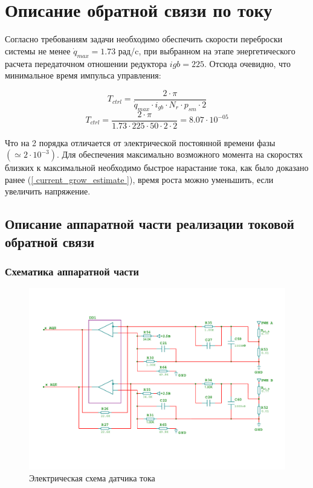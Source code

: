 \newpage
\section{ Описание обратной связи по току }
Согласно требованиям задачи необходимо обеспечить скорости переброски системы не менее
$ \dot{q}_{max} = 1.73$ рад/c, при выбранном на этапе энергетического расчета передаточном
отношении редуктора $ i{gb} = 225 $. Отсюда очевидно, что минимальное время импульса управления:

$$
    T_{ctrl} = \frac{ 2 \cdot \pi }{ \dot{q}_{max} \cdot i_{gb} \cdot N_{r} \cdot p_{sm} \cdot 2 }
$$
$$
    T_{ctrl} = \frac{ 2 \cdot \pi }{ 1.73 \cdot 225 \cdot 50 \cdot 2 \cdot 2 } = 8.07 \cdot 10^{-05}
$$

Что на 2 порядка отличается от электрической постоянной времени фазы $( \simeq2 \cdot 10^{-3} )$.
Для обеспечения максимально возможного момента на скоростях близких к максимальной необходимо
быстрое нарастание тока, как было доказано ранее (\ref{ current_grow_estimate }), время роста можно
уменьшить, если увеличить напряжение.

\subsection{ Описание аппаратной части реализации токовой обратной связи }

\subsubsection{ Схематика аппаратной части }

\begin{figure}[h!]
\centering
\includegraphics[width=\textwidth, keepaspectratio, clip=true, trim=0mm 25mm 0mm 25mm]{./src/pictures/current_measuring_sheme}
\caption{Электрическая схема датчика тока}
\label{graph_speed_and_angle_comutation}
\end{figure}

